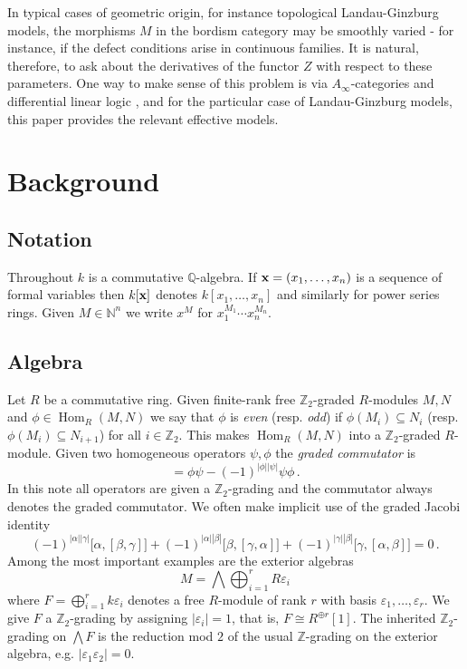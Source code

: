 \documentclass[english,letter paper,12pt,leqno]{article}
\theoremstyle{example}
\numberwithin{equation}{section}
\def\Hom{\operatorname{Hom}}
\def\be{\begin{equation}}
\def\ee{\end{equation}}
\def\nZ{\mathds{Z}}
\begin{document}
In typical cases of geometric origin, for instance topological Landau-Ginzburg models, the morphisms $M$ in the bordism category may be smoothly varied - for instance, if the defect conditions arise in continuous families. It is natural, therefore, to ask about the derivatives of the functor $Z$ with respect to these parameters. One way to make sense of this problem is via $A_\infty$-categories and differential linear logic \cite{??,??}, and for the particular case of Landau-Ginzburg models, this paper provides the relevant effective models.

\section{Background}

\subsection{Notation}

Throughout $k$ is a commutative $\mathbb{Q}$-algebra. If $\bold{x} = (x_1,\ldots,x_n)$ is a sequence of formal variables then $k[\bold{x}]$ denotes $k[x_1,\ldots,x_n]$ and similarly for power series rings. Given $M \in \mathbb{N}^n$ we write $x^M$ for $x_1^{M_1} \cdots x_n^{M_n}$.

\subsection{Algebra}

Let $R$ be a commutative ring. Given finite-rank free $\nZ_2$-graded $R$-modules $M, N$ and $\phi \in \Hom_R(M,N)$ we say that $\phi$ is \emph{even} (resp. \emph{odd}) if $\phi(M_i) \subseteq N_i$ (resp. $\phi(M_i) \subseteq N_{i+1}$) for all $i \in \nZ_2$. This makes $\Hom_R(M,N)$ into a $\nZ_2$-graded $R$-module. Given two homogeneous operators $\psi, \phi$ the \emph{graded commutator} is
\be
[\phi, \psi] = \phi \psi - (-1)^{|\phi||\psi|} \psi \phi\,.
\ee
In this note all operators are given a $\nZ_2$-grading and the commutator always denotes the graded commutator. We often make implicit use of the graded Jacobi identity
\be\label{eq:graded_jacobi}
(-1)^{|\alpha||\gamma|}\big[ \alpha, [\beta, \gamma]\big] + (-1)^{|\alpha||\beta|}\big[ \beta, [\gamma, \alpha] \big] + (-1)^{|\gamma||\beta|} \big[ \gamma, [\alpha, \beta] \big] = 0\,.
\ee
Among the most important examples are the exterior algebras
\[
M = \bigwedge \bigoplus_{i=1}^r R \varepsilon_i
\]
where $F = \bigoplus_{i=1}^r k \varepsilon_i$ denotes a free $R$-module of rank $r$ with basis $\varepsilon_1,\ldots,\varepsilon_r$. We give $F$ a $\nZ_2$-grading by assigning $|\varepsilon_i| = 1$, that is, $F \cong R^{\oplus r}[1]$. The inherited $\nZ_2$-grading on $\bigwedge F$ is the reduction mod $2$ of the usual $\nZ$-grading on the exterior algebra, e.g. $|\varepsilon_1 \varepsilon_2| = 0$.
\end{document}
